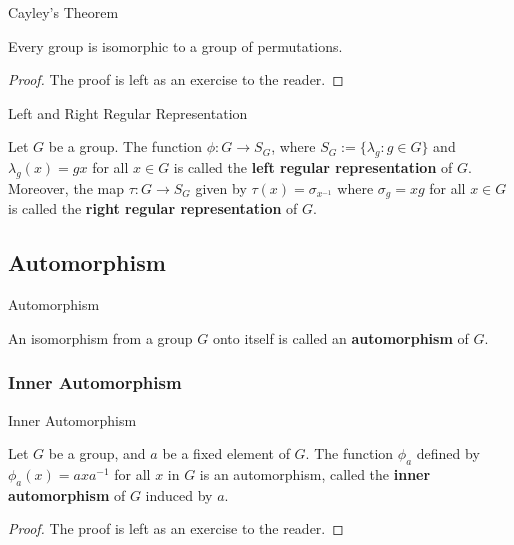 \documentclass{beamer}
\begin{document}
\begin{frame}{Cayley's Theorem}
\begin{theorem}
\justifying
Every group is isomorphic to a group of permutations.
\end{theorem}
\pause
\begin{proof}
The proof is left as an exercise to the reader.    
\end{proof}
\end{frame}

\begin{frame}{Left and Right Regular Representation}
\begin{definition}
\justifying
Let $G$ be a group. The function $\phi: G \rightarrow S_G$, where $S_G := \{\lambda_g: g \in G\}$ and $\lambda_g(x) = gx$ for all $x \in G$ is called the \textbf{left regular representation} of $G$. Moreover, the map $\tau: G \rightarrow S_G$ given by $\tau(x) = \sigma_{x^{-1}}$ where $\sigma_g = xg$ for all $x \in G$ is called the \textbf{right regular representation} of $G$.
\end{definition}    
\end{frame}

\subsection{Automorphism}

\begin{frame}{Automorphism}
    \begin{definition}
    \justifying
        An isomorphism from a group $G$ onto itself is called an \textbf{automorphism} of $G$.
    \end{definition}
\end{frame}

\subsubsection{Inner Automorphism}

\begin{frame}{Inner Automorphism}
    \begin{theorem}
        \justifying
        Let $G$ be a group, and $a$ be a fixed element of $G$. The function $\phi_a$ defined by $\phi_a(x) = axa^{-1}$ for all $x$ in $G$ is an automorphism, called the \textbf{inner automorphism} of $G$ induced by $a$.  
    \end{theorem}
    \pause
    \begin{proof}
        The proof is left as an exercise to the reader.    
    \end{proof}
\end{frame}
\end{document}
